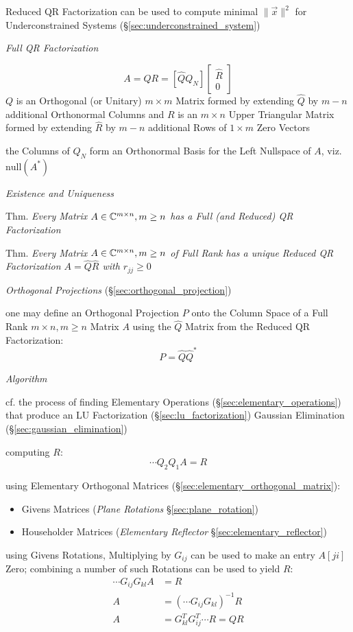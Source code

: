Reduced QR Factorization can be used to compute minimal $\|\vec{x}\|^2$ for
Underconstrained Systems (\S\ref{sec:underconstrained_system})


\emph{Full QR Factorization}

\[
  A = QR = [\hat{Q}Q_N]\begin{bmatrix} \hat{R} \\ 0 \end{bmatrix}
\]
$Q$ is an Orthogonal (or Unitary) $m \times m$ Matrix formed by extending
$\hat{Q}$ by $m - n$ additional Orthonormal Columns and $R$ is an $m \times n$
Upper Triangular Matrix formed by extending $\hat{R}$ by $m - n$ additional
Rows of $1 \times m$ Zero Vectors

the Columns of $Q_N$ form an Orthonormal Basis for the Left Nullspace of $A$,
viz. $\mathrm{null}(A^*)$


\emph{Existence and Uniqueness}

Thm. \emph{Every Matrix $A \in \mathbb{C}^{m \times n}, m \geq n$ has a Full (and
  Reduced) QR Factorization}

Thm. \emph{Every Matrix $A \in \mathbb{C}^{m \times n}, m \geq n$ of Full Rank has
  a unique Reduced QR Factorization $A = \hat{Q}\hat{R}$ with $r_{jj} \geq 0$}


\emph{Orthogonal Projections} (\S\ref{sec:orthogonal_projection})

one may define an Orthogonal Projection $P$ onto the Column Space of a Full Rank
$m \times n, m \geq n$ Matrix $A$ using the $\hat{Q}$ Matrix from the Reduced
QR Factorization:
\[
  P = \hat{Q}\hat{Q}^*
\]


\emph{Algorithm}

cf. the process of finding Elementary Operations
(\S\ref{sec:elementary_operations}) that produce an LU Factorization
(\S\ref{sec:lu_factorization}) \fist Gaussian Elimination
(\S\ref{sec:gaussian_elimination})

computing $R$:
\[
  \cdots Q_2 Q_1 A = R
\]

using Elementary Orthogonal Matrices (\S\ref{sec:elementary_orthogonal_matrix}):
\begin{itemize}
  \item Givens Matrices (\emph{Plane Rotations} \S\ref{sec:plane_rotation})
  \item Householder Matrices (\emph{Elementary Reflector}
    \S\ref{sec:elementary_reflector})
\end{itemize}

using Givens Rotations, Multiplying by $G_{ij}$ can be used to make an entry
$A[ji]$ Zero; combining a number of such Rotations can be used to yield $R$:
\begin{align*}
  \cdots G_{ij}G_{kl}A & = R \\
  A & = (\cdots G_{ij}G_{kl})^{-1}R \\
  A & = G_{kl}^T G_{ij}^T \cdots R = QR
\end{align*}


